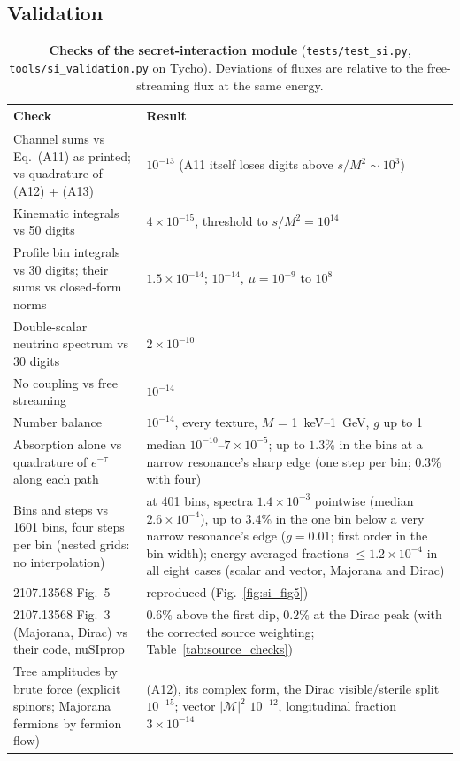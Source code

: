 \documentclass[11pt,a4paper]{article}
\newcommand{\file}[1]{\nolinkurl{#1}}
\begin{document}
\subsection{Validation}
\label{sec:si_validation}

\begin{table}[h]
\centering
\caption{\textbf{Checks of the secret-interaction module} (\file{tests/test_si.py},
\file{tools/si_validation.py} on Tycho). Deviations of fluxes are relative to the free-streaming
flux at the same energy.}
\label{tab:si_checks}
\small
\begin{tabular}{p{6.6cm}p{7.4cm}}
\toprule
Check & Result \\
\midrule
Channel sums vs Eq.~(A11) as printed; vs quadrature of (A12) + (A13) & $10^{-13}$ (A11 itself loses digits above $s/M^2\sim10^3$) \\
Kinematic integrals vs 50 digits & $4\times10^{-15}$, threshold to $s/M^2 = 10^{14}$ \\
Profile bin integrals vs 30 digits; their sums vs closed-form norms & $1.5\times10^{-14}$; $10^{-14}$, $\mu = 10^{-9}$ to $10^8$ \\
Double-scalar neutrino spectrum vs 30 digits & $2\times10^{-10}$ \\
No coupling vs free streaming & $10^{-14}$ \\
Number balance & $10^{-14}$, every texture, $M$ = 1~keV--1~GeV, $g$ up to 1 \\
Absorption alone vs quadrature of $e^{-\tau}$ along each path & median $10^{-10}$--$7\times10^{-5}$; up to $1.3\%$ in the bins at a narrow resonance's sharp edge (one step per bin; $0.3\%$ with four) \\
Bins and steps vs 1601 bins, four steps per bin (nested grids: no interpolation) & at 401 bins, spectra $1.4\times10^{-3}$ pointwise (median $2.6\times10^{-4}$), up to 3.4\% in the one bin below a very narrow resonance's edge ($g = 0.01$; first order in the bin width); energy-averaged fractions $\le1.2\times10^{-4}$ in all eight cases (scalar and vector, Majorana and Dirac) \\
2107.13568 Fig.~5 & reproduced (Fig.~\ref{fig:si_fig5}) \\
2107.13568 Fig.~3 (Majorana, Dirac) vs their code, nuSIprop & $0.6\%$ above the first dip, $0.2\%$ at the Dirac peak (with the corrected source weighting; Table~\ref{tab:source_checks}) \\
Tree amplitudes by brute force (explicit spinors; Majorana fermions by fermion flow) & (A12), its complex form, the Dirac visible/sterile split $10^{-15}$; vector $|\mathcal M|^2$ $10^{-12}$, longitudinal fraction $3\times10^{-14}$ \\

\end{tabular}
\end{table}
\end{document}
